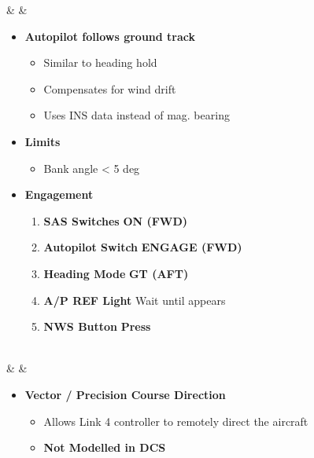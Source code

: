\documentclass[fontInter]{TechCheck}
\begin{document}
\begin{listlongtable}
		\midrule
		\textbf{\textbf{\textbullet}} &  &
		\begin{minipage}[t]{\linewidth}
			\vspace{-7pt}
			\begin{itemize}
				\item \textbf{Autopilot follows ground track}
				\begin{itemize}
					\item Similar to heading hold
					\item Compensates for wind drift
					\item Uses INS data instead of mag. bearing
				\end{itemize}
				\item \textbf{Limits}
				\begin{itemize}
					\item Bank angle < 5 deg
				\end{itemize}
				\item \textbf{Engagement}
				\begin{enumerate}
					\item \textbf{SAS Switches} \dotfill \textbf{ON (FWD)}
					\item \textbf{Autopilot Switch} \dotfill \textbf{ENGAGE (FWD)}
					\item \textbf{Heading Mode} \dotfill \textbf{GT (AFT)}
					\item \textbf{A/P REF Light} \dotfill Wait until appears
					\item \textbf{NWS Button} \dotfill \textbf{Press}
				\end{enumerate}
			\end{itemize}
		\end{minipage} \\
		\midrule
		\textbf{\textbullet} &  &
		\begin{minipage}[t]{\linewidth}
			\vspace{-7pt}
			\begin{itemize}
				\item \textbf{Vector / Precision Course Direction}
				\begin{itemize}
					\item Allows Link 4 controller to remotely direct the aircraft
					\item \textbf{Not Modelled in DCS}
				\end{itemize}
			\end{itemize}
		\end{minipage} \\

\end{listlongtable}
\end{document}
